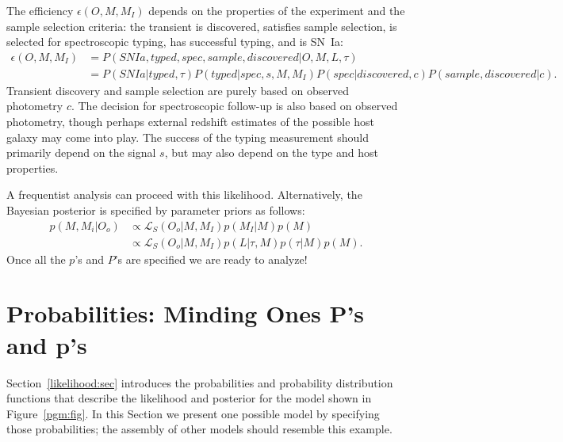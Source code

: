 \documentclass[preprint,3p]{elsarticle}
\begin{document}
The efficiency $\epsilon(O, M, M_I) $ depends on the properties of the experiment and the sample selection criteria:
the transient is discovered, satisfies sample selection, is selected for spectroscopic typing, has successful typing, and is SN~Ia:
\begin{align*}
\epsilon(O, M, M_I)  & = P(SNIa, typed, spec, sample, discovered |O, M, L, \tau)\\
& = P(SNIa|  typed, \tau)P(typed | spec, s, M, M_I)P(spec | discovered, c) P(sample, discovered| c).
\end{align*}
Transient discovery and sample selection are purely based on observed photometry $c$.
The decision for spectroscopic follow-up is also based on observed photometry,  though perhaps external redshift estimates
of the possible host galaxy may come into play.  The success of the typing measurement should primarily depend
on the signal $s$, but may also depend on the type and host properties. 

A frequentist analysis can proceed with this likelihood.
Alternatively, the Bayesian posterior is specified by parameter priors as follows:
\begin{align*}
p(M, M_i | O_o) & \propto \mathcal{L}_S(O_o| M, M_I) p(M_I|M) p(M)\\
 & \propto \mathcal{L}_S(O_o| M, M_I) p(L| \tau, M) p(\tau|M) p(M).
\end{align*}
Once all the $p$'s and $P$'s are specified we are ready to analyze!

\section{Probabilities: Minding Ones P's and p's}
Section~\ref{likelihood:sec} introduces the probabilities and probability distribution functions that describe the likelihood
and posterior for the model shown in Figure~\ref{pgm:fig}.
In this Section we present one possible model by specifying those probabilities; the assembly of other models should
resemble this example.
\end{document}
